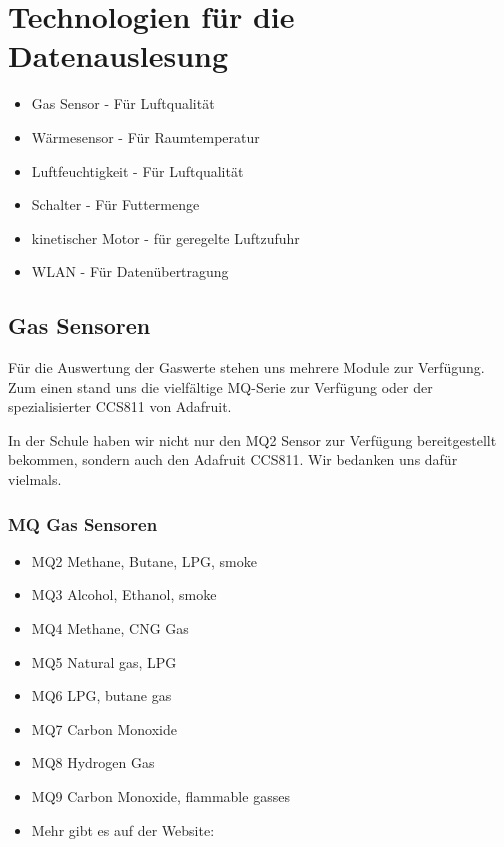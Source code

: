 \newpage
\def \currentAuthor{Kevin Glatz}


\section{Technologien für die Datenauslesung}

\begin{itemize}
	\item Gas Sensor - Für Luftqualität
	\item Wärmesensor - Für Raumtemperatur	
	\item Luftfeuchtigkeit - Für Luftqualität
	\item Schalter - Für Futtermenge
	\item kinetischer Motor - für geregelte Luftzufuhr
	\item WLAN - Für Datenübertragung

\end{itemize}

\subsection{Gas Sensoren}
Für die Auswertung der Gaswerte stehen uns mehrere Module zur Verfügung.  Zum einen stand uns die vielfältige MQ-Serie zur Verfügung oder der spezialisierter CCS811 von Adafruit. 

In der Schule haben wir nicht nur den MQ2 Sensor zur Verfügung bereitgestellt bekommen, sondern auch den Adafruit CCS811. Wir bedanken uns dafür vielmals.

\subsubsection{MQ Gas Sensoren}

\begin{itemize}
\item {MQ2}
	Methane, Butane, LPG, smoke
\item {MQ3}
	Alcohol, Ethanol, smoke
\item {MQ4}
	Methane, CNG Gas
\item {MQ5}
	Natural gas, LPG
\item {MQ6}
	LPG, butane gas
\item {MQ7}
	Carbon Monoxide
\item {MQ8}
	Hydrogen Gas
\item {MQ9}
	Carbon Monoxide, flammable gasses
\item Mehr gibt es auf der Website: \cite{MQ_Sensoren}
\end{itemize}



